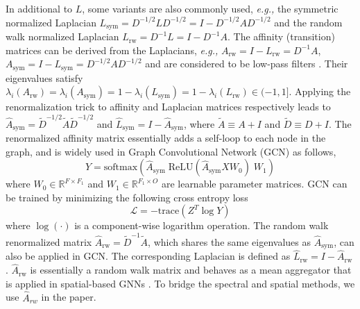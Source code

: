 \documentclass{article}
\newcommand\eg{\textit{e.g.,}}
\newcommand{\trace}{\mathrm{trace}}
\newcommand{\Rbb}{{\mathbb{R}}}
\newcommand{\0}{{\boldsymbol{0}}}
\newcommand{\6}{{\partial}}
\newcommand{\8}{{\infty}}
\newcommand{\4}{{\nabla}}
\begin{document}
In additional to $L$, some variants are also commonly used, \eg{} the symmetric normalized Laplacian $L_{\text{sym}} = D^{-1/2} L D^{-1/2} = I-D^{-1/2} A D^{-1/2}$ and the random walk normalized Laplacian $L_{\text{rw}} = D^{-1} L = I - D^{-1} A$. The affinity (transition) matrices can be derived from the Laplacians, \eg{} $A_\text{rw} = I - L_\text{rw} = D^{-1} A$, $A_\text{sym} = I-L_\text{sym} = D^{-1/2} A D^{-1/2}$ and are considered to be low-pass filters \cite{maehara2019revisiting}.
Their eigenvalues satisfy $\lambda_i(A_\text{rw}) = \lambda_i(A_\text{sym}) = 1- \lambda_i(L_\text{sym}) = 1- \lambda_i(L_\text{rw}) \in (-1,1]$. 
Applying the renormalization trick \cite{kipf2016classification} to affinity and Laplacian matrices respectively leads to $\hat{A}_\text{sym} = \tilde{D}^{-1/2} \tilde{A} \tilde{D}^{-1/2}$ and $\hat{L}_{\text{sym}} = I - \hat{A}_\text{sym}$, 
where $\tilde{A} \equiv A+I$ and $\tilde{D} \equiv D+I$. The renormalized affinity matrix essentially adds a self-loop to each node in the graph, and is widely used in Graph Convolutional Network (GCN) \cite{kipf2016classification} as follows,
\begin{equation}
    \label{eq:gcn_original}
   Y = \text{softmax} (\hat{A}_\text{sym} \; \text{ReLU} (\hat{A}_\text{sym} {X} W_0 ) \; W_1 )
\end{equation}
where $W_0 \in \Rbb^{F\times F_1}$ and $W_1 \in \Rbb^{F_1\times O}$ are learnable parameter matrices. GCN can be trained by minimizing the following cross entropy loss
\begin{equation}
\label{eq:cross_entropy_loss}
     \mathcal{L}  = -\trace(Z^T \log Y)
\end{equation}
where $\log(\cdot)$ is a component-wise logarithm operation. The random walk renormalized matrix $\hat{A}_{\text{rw}} = \tilde{D}^{-1} \tilde{A}$,
which shares the same eigenvalues as $\hat{A}_{\text{sym}}$, can also be applied in GCN. The corresponding Laplacian is defined as $\hat{L}_{\text{rw}} = I - \hat{A}_\text{rw}$. 
$\hat{A}_{\text{rw}}$ is essentially a random walk matrix and
behaves as a mean aggregator that is applied in spatial-based GNNs \cite{hamilton2017inductive,hamilton2020graph}. To bridge the spectral and spatial methods, we use $\hat{A}_{rw}$ in the paper.
\end{document}
